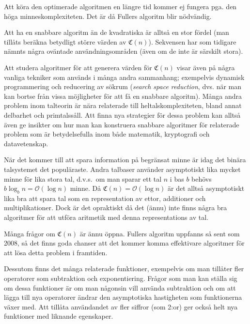 \documentclass[a4paper,titlepage]{article}
\newcommand{\C}[1]{\mathfrak C \left( #1 \right)}
\renewcommand{\O}{\mathcal {O}}
\theoremstyle{definition}
\begin{document}
        \noindent
        Att köra den optimerade algoritmen en längre tid kommer ej fungera
        pga. den höga minneskomplexiteten. Det är då Fullers algoritm blir
        nödvändig. 
        
        Att ha en snabbare algoritm än de kvadratiska är alltså en stor fördel
        (man tillåts beräkna betydligt större värden av $\C{n}$). Sekvensen har
        som tidigare nämnts några oväntade användningsområden (även om de inte är
        särskilt stora).

        Att studera algoritmer för att generera värden för $\C{n}$ visar
        även på några vanliga tekniker som används i många andra sammanhang;
        exempelvis dynamisk programmering och reducering av sökrum (\emph{search
        space reduction}, dvs. när man kan bortse från vissa möjligheter för att
        få en snabbare algoritm). Många andra problem inom talteorin är nära
        relaterade till heltalskomplexiteten, bland annat delbarhet och primtalssåll.
        Att finna nya strategier för dessa problem kan alltså även ge
        insikter om hur man kan konstruera snabbare algoritmer för relaterade
        problem som är betydelsefulla inom både matematik, kryptografi och
        datavetenskap. 

        När det kommer till att spara information på begränsat minne är idag det
        binära talsystemet det populäraste. Andra talbaser använder
        asymptotiskt lika mycket minne för lika stora tal, d.v.s.\ om man sparar
        ett tal $n$ i bas $b$ behövs $b\log_b n = \O(\log n)$ minne. Då $\C{n} =
        \O(\log n)$ är det alltså asymptotiskt lika bra att spara tal som en
        representation av ettor, additioner och multiplikationer. Dock är det
        opraktiskt då det (ännu) inte finns några bra algoritmer för att utföra
        aritmetik med denna representations av tal.

        Många frågor om $\C{n}$ är ännu öppna. Fullers algoritm uppfanns
        så sent som 2008, så det finns goda chanser att det kommer komma
        effektivare algoritmer för att lösa detta problem i framtiden. 
        
        Dessutom finns det många relaterade funktioner, exempelvis om man tillåter
        fler operatorer som subtraktion och exponentiering. Frågor som man kan
        ställa sig om dessa funktioner är om man någonsin vill använda
        subtraktion och om att lägga till nya operatorer ändrar den
        asymptotiska hastigheten som funktionerna växer med.
        Att tillåta användandet av fler siffror (som 2:or) ger också helt nya
        funktioner med liknande egenskaper. 
\end{document}
